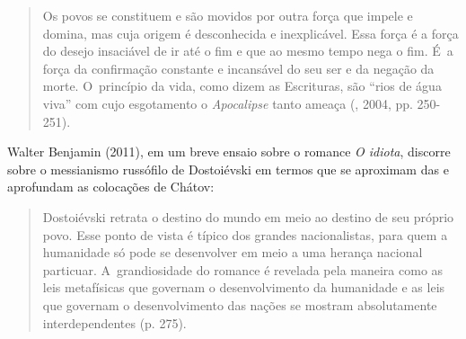 \begin{quote}
Os povos se constituem e são movidos por outra força que impele e
domina, mas cuja origem é desconhecida e inexplicável. Essa força é a
força do desejo insaciável de ir até o fim e que ao mesmo tempo nega o
fim. É~a força da confirmação constante e incansável do seu ser e da
negação da morte. O~princípio da vida, como dizem as Escrituras, são
``rios de água viva'' com cujo esgotamento o \emph{Apocalipse} tanto
ameaça (, 2004, pp. 250-251).
\end{quote}

Walter Benjamin (2011), em um breve ensaio sobre o romance \emph{O
idiota}, discorre sobre o messianismo russófilo de Dostoiévski em termos
que se aproximam das e aprofundam as colocações de Chátov:

\begin{quote}
Dostoiévski retrata o destino do mundo em meio ao destino de seu próprio
povo. Esse ponto de vista é típico dos grandes nacionalistas, para quem
a humanidade só pode se desenvolver em meio a uma herança nacional
particuar. A~grandiosidade do romance é revelada pela maneira como as
leis metafísicas que governam o desenvolvimento da humanidade e as leis
que governam o desenvolvimento das nações se mostram absolutamente
interdependentes (p. 275).
\end{quote}

